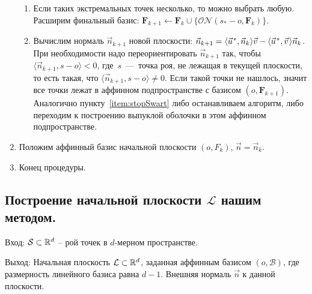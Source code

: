 \documentclass[a4paper,12pt]{article}
\newcommand{\R}[1][]{%
  \ifthenelse{\equal{#1}{}}%
  {\mathbb{R}}%
  {\mathbb{R}^{#1}}}
\newcommand{\Swarm}{\mathcal{S}}              %
\newcommand{\Basis}{\mathcal{B}}              %
\newcommand{\set}[2][]{#1\{ #2 #1\}}                    %
\newcommand{\scalprod}[3][]{#1\langle #2, #3 #1\rangle} %
\newcommand{\ONorm}[3][]{\mathcal{ON}#1( #2, #3 #1)} %
\newcommand{\FinalVec}{\mathbf{F}} %
\newcommand{\Plane}{\mathcal{L}}           %
\renewcommand{\.}{\hspace{0.2ex}}
\begin{document}
\begin{enumerate}
\begin{enumerate}
        \item  Если таких экстремальных точек несколько, то можно выбрать любую. Расширим финальный базис: $\FinalVec_{k+1} \leftarrow \FinalVec_k \cup \set[\big]{\ONorm{s_* - o}{\FinalVec_k}}$.


        \item Вычислим нормаль $\vec n_{k+1}$ новой плоскости: $\vec n_{k+1} = \scalprod{\vec u\.^*}{\vec n_k}\vec v - \scalprod{\vec u\.^*}{\vec v \.}\vec n_k$. При необходимости надо переориентировать $\vec n_{k+1}$ так, чтобы $\scalprod{\vec n_{k+1}}{s - o} < 0$, где~$s$~---~точка роя, не лежащая в текущей плоскости, то есть такая, что $\scalprod{\vec n_{k+1}}{s - o} \neq 0$. Если такой точки не нашлось, значит все точки лежат в аффинном подпространстве с базисом $(o, \FinalVec_{k+1})$. Аналогично пункту~\ref{item:stopSwart} либо останавливаем алгоритм, либо переходим к построению выпуклой оболочки в этом аффинном подпространстве.


      \end{enumerate}


      \item Положим аффинный базис начальной плоскости $(o, F_k)$, $\vec n = \vec n_k$.

      \item Конец процедуры.
    \end{enumerate}

  \subsection{Построение начальной плоскости $\Plane$ нашим методом.}
    \label{subsec:InitialPlaneUs}

    Вход: $\Swarm \subset \R[d]$ -- рой точек в $d$-мерном пространстве.

    Выход: Начальная плоскость $\Plane \subset \R[d]$, заданная аффинным базисом $(o,\Basis)$, где размерность линейного базиса равна $d-1$. Внешняя нормаль $\vec n$ к данной плоскости.
\end{document}
